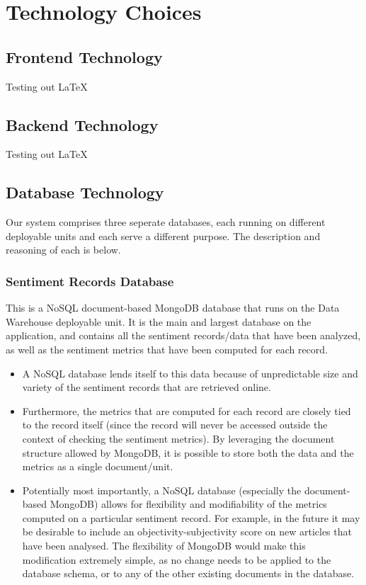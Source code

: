 \documentclass[12pt]{article}
\begin{document}
\section{Technology Choices}
\subsection{Frontend Technology}
Testing out LaTeX
\subsection{Backend Technology}
Testing out LaTeX
\subsection{Database Technology}
Our system comprises three seperate databases, each running on different deployable units and each serve a different purpose. The description and reasoning of each is below.
\subsubsection{Sentiment Records Database}
This is a NoSQL document-based MongoDB database that runs on the Data Warehouse deployable unit. It is the main and largest database on the application, and contains all the sentiment records/data that have been analyzed, as well as the sentiment metrics that have been computed for each record.
\begin{itemize}
    \item A NoSQL database lends itself to this data because of unpredictable size and variety of the sentiment records that are retrieved online.
    \item Furthermore, the metrics that are computed for each record are closely tied to the record itself (since the record will never be accessed outside the context of checking the sentiment metrics). By leveraging the document structure allowed by MongoDB, it is possible to store both the data and the metrics as a single document/unit.
    \item Potentially most importantly, a NoSQL database (especially the document-based MongoDB) allows for flexibility and modifiability of the metrics computed on a particular sentiment record. For example, in the future it may be desirable to include an objectivity-subjectivity score on new articles that have been analysed. The flexibility of MongoDB would make this modification extremely simple, as no change needs to be applied to the database schema, or to any of the other existing documents in the database.
\end{itemize}
\end{document}
